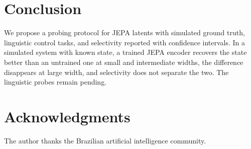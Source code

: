 \documentclass[conference]{IEEEtran}
\begin{document}
\section{Conclusion}
We propose a probing protocol for JEPA latents with simulated ground truth, linguistic control tasks, and selectivity reported with confidence intervals. In a simulated system with known state, a trained JEPA encoder recovers the state better than an untrained one at small and intermediate widths, the difference disappears at large width, and selectivity does not separate the two. The linguistic probes remain pending.

\section*{Acknowledgments}
The author thanks the Brazilian artificial intelligence community.

\nocite{ctl_full_names}


\end{document}
